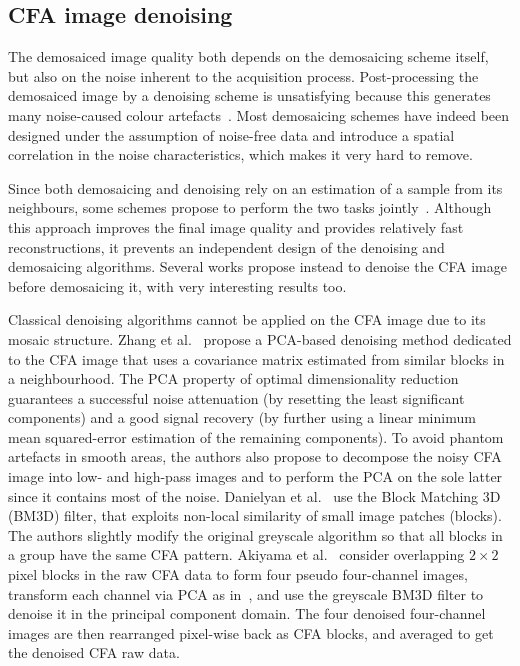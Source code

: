 \documentclass[twoside]{article}
\begin{document}
\subsection{CFA image denoising}
\label{subsec:denoising}

The demosaiced image quality both depends on the demosaicing scheme itself, but also on the noise inherent to the acquisition process. Post-processing the demosaiced image by a denoising scheme is unsatisfying because this generates many noise-caused colour artefacts~\cite{zhang_ip_2009}. Most demosaicing schemes have indeed been designed under the assumption of noise-free data and introduce a spatial correlation in the noise characteristics, which makes it very hard to remove.

Since both demosaicing and denoising rely on an estimation of a sample from its neighbours, some schemes propose to perform the two tasks jointly~\cite{condat_icip_2012,goossens_icip_2013,khashabi_ip_2014}. Although this approach improves the final image quality and provides relatively fast reconstructions, it prevents an independent design of the denoising and demosaicing algorithms. Several works propose instead to denoise the CFA image before demosaicing it, with very interesting results too.

Classical denoising algorithms cannot be applied on the CFA image due to its mosaic structure. Zhang et al.~\cite{zhang_ip_2009} propose a PCA-based denoising method dedicated to the CFA image that uses a covariance matrix estimated from similar blocks in a neighbourhood. The PCA property of optimal dimensionality reduction guarantees a successful noise attenuation (by resetting the least significant components) and a good signal recovery (by further using a linear minimum mean squared-error estimation of the remaining components). To avoid phantom artefacts in smooth areas, the authors also propose to decompose the noisy CFA image into low- and high-pass images and to perform the PCA on the sole latter since it contains most of the noise.
Danielyan et al.~\cite{danielyan_lnla_2009} use the Block Matching 3D (BM3D) filter, that exploits non-local similarity of small image patches (blocks). The authors slightly modify the original greyscale algorithm so that all blocks in a group have the same CFA pattern. 
Akiyama et al.~\cite{akiyama_icip_2015} consider overlapping $2 \times 2$ pixel blocks in the raw CFA data to form four pseudo four-channel images, transform each channel via PCA as in~\cite{zhang_ip_2009}, and use the greyscale BM3D filter to denoise it in the principal component domain. The four denoised four-channel images are then rearranged pixel-wise back as CFA blocks, and averaged to get the denoised CFA raw data.
\end{document}
